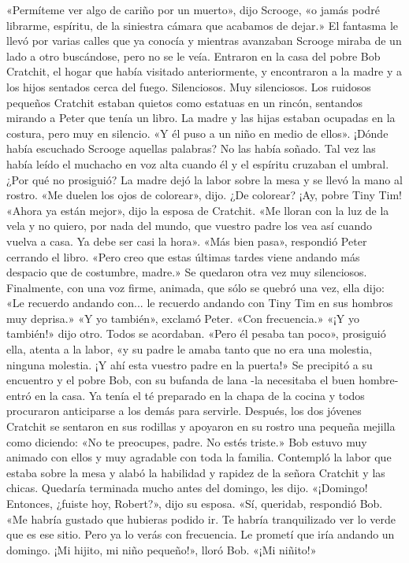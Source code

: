 \documentclass{novela}
\begin{document}
 «Permíteme ver algo de cariño por un muerto», dijo Scrooge, «o jamás podré librarme, espíritu, de la siniestra cámara que acabamos de dejar.»
 El fantasma le llevó por varias calles que ya conocía y mientras avanzaban Scrooge miraba de un lado a otro buscándose, pero no se le veía. Entraron en la casa del pobre Bob Cratchit, el hogar que había visitado anteriormente, y encontraron a la madre y a los hijos sentados cerca del fuego.
 Silenciosos. Muy silenciosos. Los ruidosos pequeños Cratchit estaban quietos como estatuas en un rincón, sentandos mirando a Peter que tenía un libro. La madre y las hijas estaban ocupadas en la costura, pero muy en silencio.
 «Y él puso a un niño en medio de ellos».
 ¡Dónde había escuchado Scrooge aquellas palabras? No las había soñado. Tal vez las había leído el muchacho en voz alta cuando él y el espíritu cruzaban el umbral. ¿Por qué no prosiguió?
 La madre dejó la labor sobre la mesa y se llevó la mano al rostro.
 «Me duelen los ojos de colorear», dijo.
 ¿De colorear? ¡Ay, pobre Tiny Tim!
 «Ahora ya están mejor», dijo la esposa de Cratchit. «Me lloran con la luz de la vela y no quiero, por nada del mundo, que vuestro padre los vea así cuando vuelva a casa. Ya debe ser casi la hora».
 «Más bien pasa», respondió Peter cerrando el libro. «Pero creo que estas últimas tardes viene andando más despacio que de costumbre, madre.»
 Se quedaron otra vez muy silenciosos. Finalmente, con una voz firme, animada, que sólo se quebró una vez, ella dijo:
 «Le recuerdo andando con... le recuerdo andando con Tiny Tim en sus hombros muy deprisa.»
 «Y yo también», exclamó Peter. «Con frecuencia.»
 «¡Y yo también!» dijo otro. Todos se acordaban.
 «Pero él pesaba tan poco», prosiguió ella, atenta a la labor, «y su padre le amaba tanto que no era una molestia, ninguna molestia. ¡Y ahí esta vuestro padre en la puerta!»
 Se precipitó a su encuentro y el pobre Bob, con su bufanda de lana -la necesitaba el buen hombre- entró en la casa. Ya tenía el té preparado en la chapa de la cocina y todos procuraron anticiparse a los demás para servirle. Después, los dos jóvenes Cratchit se sentaron en sus rodillas y apoyaron en su rostro una pequeña mejilla como diciendo: «No te preocupes, padre. No estés triste.»
 Bob estuvo muy animado con ellos y muy agradable con toda la familia. Contempló la labor que estaba sobre la mesa y alabó la habilidad y rapidez de la señora Cratchit y las chicas. Quedaría terminada mucho antes del domingo, les dijo.
 «¡Domingo! Entonces, ¿fuiste hoy, Robert?», dijo su esposa.
 «Sí, queridab, respondió Bob. «Me habría gustado que hubieras podido ir. Te habría tranquilizado ver lo verde que es ese sitio. Pero ya lo verás con frecuencia. Le prometí que iría andando un domingo. ¡Mi hijito, mi niño pequeño!», lloró Bob. «¡Mi niñito!»
\end{document}
